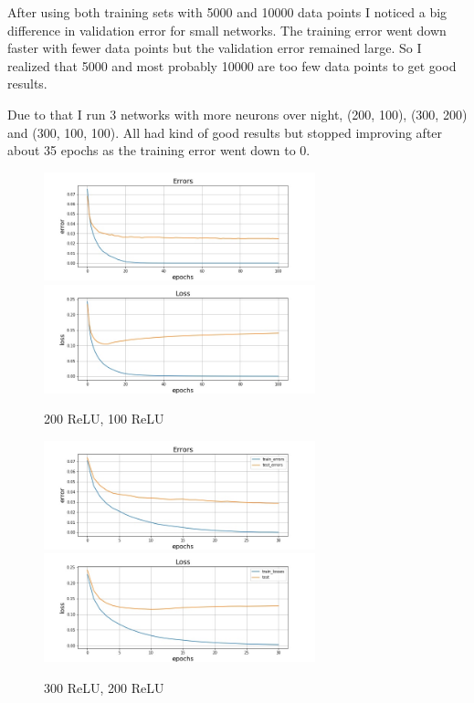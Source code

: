 \documentclass[
        a4paper,
        10pt,
        parskip = full,    %
    ]{scrartcl}
\begin{document}
After using both training sets with 5000 and 10000 data points I noticed a big difference in validation error for small networks. The training error went down faster with fewer data points but the validation error remained large. So I realized that 5000 and most probably 10000 are too few data points to get good results.

Due to that I run 3 networks with more neurons over night, (200, 100), (300, 200) and (300, 100, 100). All had kind of good results but stopped improving after about 35 epochs as the training error went down to 0.

\begin{figure}[H]
	\centering
	\includegraphics[width=0.7\textwidth]{../images/nn_200r100r_Errors.jpg}
	\includegraphics[width=0.7\textwidth]{../images/nn_200r100r_Losses.jpg}	
	\caption{200 ReLU, 100 ReLU}
	\label{nn_200r100r}
\end{figure}
\begin{figure}[H]
	\centering
	\includegraphics[width=0.7\textwidth]{../images/nn_300r200r_test_Errors.jpg}
	\includegraphics[width=0.7\textwidth]{../images/nn_300r200r_test_Losses.jpg}	
	\caption{300 ReLU, 200 ReLU}
	\label{nn_300r200r}
\end{figure}
\end{document}
